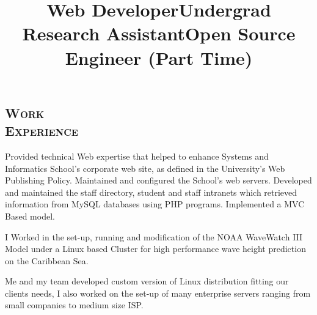\begin{resume}


\section{\textsc{Work\\ Experience}}

\title{\textbf{Web Developer}}
\begin{position}
Provided technical Web expertise that helped to enhance Systems and Informatics School's corporate web site, 
as defined in the University's Web Publishing Policy. Maintained and configured the School's web servers. Developed and maintained the staff directory, student and staff intranets which retrieved information from MySQL databases using PHP programs. Implemented a MVC Based model.
\end{position}

\title{\textbf{Undergrad Research Assistant}}
\begin{position}
I Worked in the set-up, running and modification of the NOAA WaveWatch III Model under a Linux based Cluster
for high performance wave height prediction on the Caribbean Sea.
\end{position}


\title{\textbf{Open Source Engineer} (Part Time)}
\begin{position}
Me and my team  developed custom version of Linux distribution fitting
our clients needs, I also worked on  the set-up of many enterprise servers ranging from small companies to medium size ISP.
\end{position}



\end{resume}
